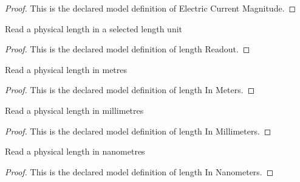 \begin{proof}
  This is the declared model definition of Electric Current Magnitude.
\end{proof}
\begin{definition}
  \label{def:physics:phyx-mini-0616:phyxminiproblems-problemphyxmini0616-lengthreadout}
  Read a physical length in a selected length unit
\end{definition}
\begin{proof}
  This is the declared model definition of length Readout.
\end{proof}
\begin{definition}
  \label{def:physics:phyx-mini-0616:phyxminiproblems-problemphyxmini0616-lengthinmeters}
  Read a physical length in metres
\end{definition}
\begin{proof}
  This is the declared model definition of length In Meters.
\end{proof}
\begin{definition}
  \label{def:physics:phyx-mini-0616:phyxminiproblems-problemphyxmini0616-lengthinmillimeters}
  Read a physical length in millimetres
\end{definition}
\begin{proof}
  This is the declared model definition of length In Millimeters.
\end{proof}
\begin{definition}
  \label{def:physics:phyx-mini-0616:phyxminiproblems-problemphyxmini0616-lengthinnanometers}
  Read a physical length in nanometres
\end{definition}
\begin{proof}
  This is the declared model definition of length In Nanometers.
\end{proof}
